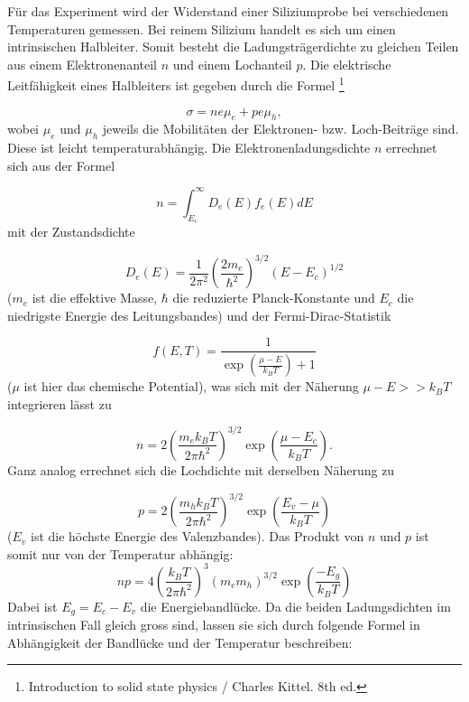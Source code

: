 \documentclass[a4paper,parskip,11pt, DIV12]{scrreprt}
\newcommand{\footnoteremember}[2]{
  \footnote{#2}
  \newcounter{#1}
  \setcounter{#1}{\value{footnote}}
}
\newcommand{\footnoterecall}[1]{%
  \footnotemark[\value{#1}]
}
\begin{document}
Für das Experiment wird der Widerstand einer Siliziumprobe bei verschiedenen Temperaturen gemessen. Bei reinem Silizium handelt es sich um einen intrinsischen Halbleiter. Somit besteht die Ladungsträgerdichte zu gleichen Teilen aus einem Elektronenanteil $n$ und einem Lochanteil $p$.
Die elektrische Leitfähigkeit eines Halbleiters ist gegeben durch die Formel\footnoteremember{kittel}{Introduction to solid state physics / Charles Kittel. 8th ed.}
\begin{equation}
\label{eq:sigma}
\sigma = ne\mu_e + pe\mu_h ,
\end{equation}
wobei $\mu_e$ und $\mu_h$ jeweils die Mobilitäten der Elektronen- bzw. Loch-Beiträge sind. Diese ist leicht temperaturabhängig. Die Elektronenladungsdichte $n$ errechnet sich aus der Formel\footnoterecall{kittel}
\begin{equation}
n = \int_{E_c}^{\infty} D_e(E) f_e(E) dE 
\end{equation}
mit der Zustandsdichte\footnoterecall{kittel}
\begin{equation}
D_e(E) = \frac{1}{2 \pi^2} \left(\frac{2 m_e}{\hbar^2}\right)^{3/2} (E - E_c)^{1/2}
\end{equation}
($m_e$ ist die effektive Masse, $\hbar$ die reduzierte Planck-Konstante und $E_c$ die niedrigste Energie des Leitungsbandes) und der Fermi-Dirac-Statistik\footnoterecall{kittel}
\begin{equation}
f(E,T) = \frac{1}{\exp \left(\frac{\mu - E}{k_B T}\right) + 1}
\end{equation}
($\mu$ ist hier das chemische Potential), was sich mit der Näherung $\mu - E >> k_B T$ integrieren lässt zu\footnoterecall{kittel}
\begin{equation}
n = 2 \left(\frac{m_e k_B T}{2 \pi \hbar^2}\right)^{3/2} \exp \left(\frac{\mu - E_c}{k_B T}\right).
\end{equation}
Ganz analog errechnet sich die Lochdichte mit derselben Näherung zu\footnoterecall{kittel}
\begin{equation}
p = 2 \left(\frac{m_h k_B T}{2 \pi \hbar^2}\right)^{3/2} \exp \left(\frac{E_v - \mu}{k_B T}\right)
\end{equation}
($E_v$ ist die höchste Energie des Valenzbandes). Das Produkt von $n$ und $p$ ist somit nur von der Temperatur abhängig:
\begin{equation}
np = 4 \left(\frac{k_B T}{2 \pi \hbar^2}\right)^{3} (m_e m_h)^{3/2} \exp \left(\frac{-E_g}{k_B T}\right)
\end{equation}
Dabei ist $E_g = E_c - E_v$ die Energiebandlücke. Da die beiden Ladungsdichten im intrinsischen Fall gleich gross sind, lassen sie sich durch folgende Formel in Abhängigkeit der Bandlücke und der Temperatur beschreiben:
\end{document}

